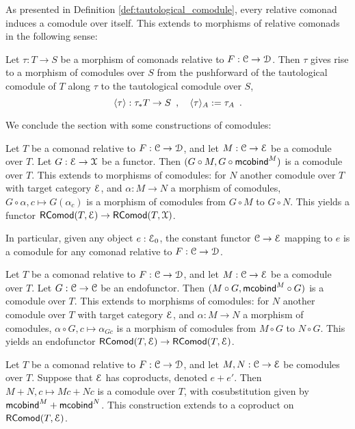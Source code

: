 \documentclass[a4paper,USenglish]{lipics}
\begin{document}
As presented in Definition \ref{def:tautological_comodule}, every relative comonad induces a comodule over itself.
This extends to morphisms of relative comonads in the following sense:

\begin{definition}%
\label{def:induced} 
  Let $\tau : T\to S$ be a morphism of comonads relative to $F : {\mathcal{C}} \to \mathcal{D}$.
  Then $\tau$ gives rise to a morphism of comodules over $S$ from the pushforward of the tautological comodule
  of $T$ along $\tau$ to the tautological comodule over $S$,
  \[ \langle {\tau} \rangle : \tau_*T \to S \enspace , \quad \langle {\tau} \rangle_A := \tau_A \enspace . \]
\end{definition}
% 
We conclude the section with some constructions of comodules:

\begin{lemma}
Let $T$ be a comonad relative to $F : {\mathcal{C}} \to \mathcal{D}$, and let $M : {\mathcal{C}} \to \mathcal{E}$ be a comodule over $T$.
Let $G : \mathcal{E} \to \mathcal{X}$ be a functor.
Then $(G \circ M, G\circ \mathsf{mcobind}^M)$ is a comodule over $T$.
This extends to morphisms of comodules: for $N$ another comodule over $T$ with target category $\mathcal{E}$, and $\alpha : M \to N$ a morphism of comodules,
$G \circ \alpha, c \mapsto G(\alpha_c)$
is a morphism of comodules from $G \circ M$ to $G \circ N$.
This yields a functor
$\mathsf{RComod}(T,\mathcal{E}) \to \mathsf{RComod}(T,\mathcal{X})$. 
\end{lemma}

In particular, given any object $e:\mathcal{E}_0$, the constant functor ${\mathcal{C}}\to\mathcal{E}$ mapping to $e$ is a comodule for any comonad relative to $F:{\mathcal{C}}\to\mathcal{D}$.

\begin{lemma}
Let $T$ be a comonad relative to $F : {\mathcal{C}} \to \mathcal{D}$, and let $M : {\mathcal{C}} \to \mathcal{E}$ be a comodule over $T$.
Let $G : {\mathcal{C}} \to {\mathcal{C}}$ be an endofunctor.
Then $(M \circ G, \mathsf{mcobind}^M \circ G)$ is a comodule over $T$.
This extends to morphisms of comodules: for $N$ another comodule over $T$ with target category $\mathcal{E}$, and $\alpha : M \to N$ a morphism of comodules,
$\alpha \circ G, c \mapsto \alpha_{Gc}$
is a morphism of comodules from $M \circ G$ to $N \circ G$.
This yields an endofunctor
$\mathsf{RComod}(T,\mathcal{E}) \to \mathsf{RComod}(T,\mathcal{E})$. 
\end{lemma}

\begin{lemma}
Let $T$ be a comonad relative to $F : {\mathcal{C}} \to \mathcal{D}$, and let $M, N: {\mathcal{C}} \to \mathcal{E}$ be comodules over $T$.
Suppose that $\mathcal{E}$ has coproducts, denoted $e + e'$.
Then $M + N, c \mapsto M c + N c$ is a comodule over $T$, with cosubstitution given by $\mathsf{mcobind}^M + \mathsf{mcobind}^N$.
This construction extends to a coproduct on $\mathsf{RComod}(T,\mathcal{E})$. 
\end{lemma}
\end{document}
